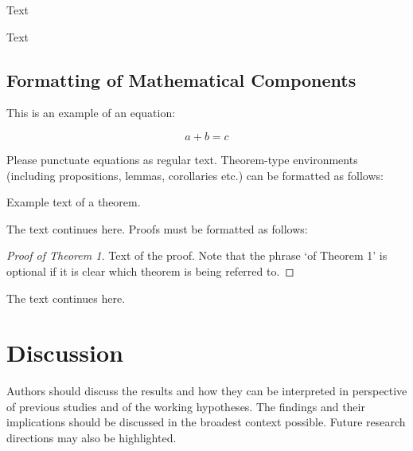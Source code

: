 \documentclass[journal,article,submit,moreauthors,pdftex,10pt,a4paper]{Definitions/mdpi}
\theoremstyle{plain}
\theoremstyle{definition}
\theoremstyle{remark}
\begin{document}
Text

Text



\subsection{Formatting of Mathematical Components}

This is an example of an equation:

\begin{equation}
a + b = c
\end{equation}

Please punctuate equations as regular text. Theorem-type environments (including propositions, lemmas, corollaries etc.) can be formatted as follows:
\begin{Theorem}
Example text of a theorem.
\end{Theorem}

The text continues here. Proofs must be formatted as follows:

\begin{proof}[Proof of Theorem 1]
Text of the proof. Note that the phrase `of Theorem 1' is optional if it is clear which theorem is being referred to.
\end{proof}
The text continues here.

\section{Discussion}

Authors should discuss the results and how they can be interpreted in perspective of previous studies and of the working hypotheses. The findings and their implications should be discussed in the broadest context possible. Future research directions may also be highlighted.
\end{document}
